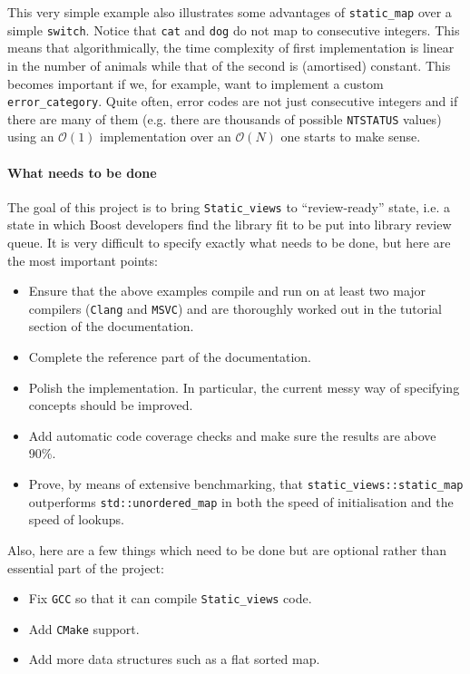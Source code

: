 \documentclass[a4paper,12pt]{article}
\begin{document}
    This very simple example also illustrates some advantages of
    \texttt{static\_map} over a simple \texttt{switch}. Notice that \texttt{cat}
    and \texttt{dog} do not map to consecutive integers. This means that
    algorithmically, the time complexity of first implementation is linear in
    the number of animals while that of the second is (amortised) constant. This
    becomes important if we, for example, want to implement a custom
    \texttt{error\_category}. Quite often, error codes are not just consecutive
    integers and if there are many of them (e.g. there are thousands of possible
    \texttt{NTSTATUS} values) using an $\mathcal{O}(1)$ implementation over an
    $\mathcal{O}(N)$ one starts to make sense.

    \paragraph{What needs to be done} The goal of this project is to bring
    \texttt{Static\_views} to ``review-ready'' state, i.e. a state in which
    Boost developers find the library fit to be put into library review queue.
    It is very difficult to specify exactly what needs to be done, but here are
    the most important points:
    \begin{itemize}
        \item Ensure that the above examples compile and run on at least two
            major compilers (\texttt{Clang} and \texttt{MSVC}) and are
            thoroughly worked out in the tutorial section of the documentation.
        \item Complete the reference part of the documentation.
        \item Polish the implementation. In particular, the current messy way of
            specifying concepts should be improved.
        \item Add automatic code coverage checks and make sure the results are
            above 90\%.
        \item Prove, by means of extensive benchmarking, that
            \texttt{static\_views::static\_map} outperforms
            \texttt{std::unordered\_map} in both the speed of initialisation and
            the speed of lookups.
    \end{itemize}
    Also, here are a few things which need to be done but are optional rather
    than essential part of the project:
    \begin{itemize}
        \item Fix \texttt{GCC} so that it can compile \texttt{Static\_views}
            code.
        \item Add \texttt{CMake} support.
        \item Add more data structures such as a flat sorted map.
    \end{itemize}
\end{document}
